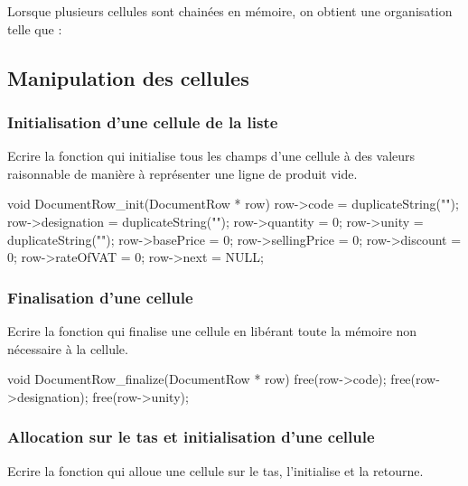 Lorsque plusieurs cellules sont chainées en mémoire, on obtient une organisation telle que :
\begin{center}
\end{center} 


\subsection{Manipulation des cellules}

\subsubsection{Initialisation d'une cellule de la liste}

Ecrire la fonction  qui initialise tous les champs d'une cellule à des valeurs \og raisonnable \fg{} de manière à représenter une ligne de produit vide.

\begin{csourcecorrection}
void DocumentRow_init(DocumentRow * row) {
    row->code = duplicateString("");
    row->designation = duplicateString("");
    row->quantity = 0;
    row->unity = duplicateString("");
    row->basePrice = 0;
    row->sellingPrice = 0;
    row->discount = 0;
    row->rateOfVAT = 0;
    row->next = NULL;
}
\end{csourcecorrection}


\subsubsection{Finalisation d'une cellule}

Ecrire la fonction  qui finalise une cellule en libérant toute la mémoire non nécessaire à la cellule.

\begin{csourcecorrection}
void DocumentRow_finalize(DocumentRow * row) {
    free(row->code);
    free(row->designation);
    free(row->unity);
}
\end{csourcecorrection}

\subsubsection{Allocation sur le tas et initialisation d'une cellule}

Ecrire la fonction  qui alloue une cellule sur le tas, l'initialise et la retourne.


